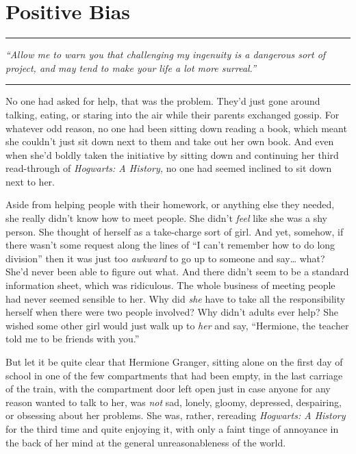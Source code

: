 \chapter{Positive Bias}

\begin{center}\rule{3in}{0.4pt}\end{center}

\emph{``Allow me to warn you that challenging my ingenuity is a
dangerous sort of project, and may tend to make your life a lot more
surreal.''}

\begin{center}\rule{3in}{0.4pt}\end{center}

No one had asked for help, that was the problem. They'd just gone around
talking, eating, or staring into the air while their parents exchanged
gossip. For whatever odd reason, no one had been sitting down reading a
book, which meant she couldn't just sit down next to them and take out
her own book. And even when she'd boldly taken the initiative by sitting
down and continuing her third read-through of \emph{Hogwarts: A
History,} no one had seemed inclined to sit down next to her.

Aside from helping people with their homework, or anything else they
needed, she really didn't know how to meet people. She didn't
\emph{feel} like she was a shy person. She thought of herself as a
take-charge sort of girl. And yet, somehow, if there wasn't some request
along the lines of ``I can't remember how to do long division'' then it
was just too \emph{awkward} to go up to someone and say\ldots{} what?
She'd never been able to figure out what. And there didn't seem to be a
standard information sheet, which was ridiculous. The whole business of
meeting people had never seemed sensible to her. Why did \emph{she} have
to take all the responsibility herself when there were two people
involved? Why didn't adults ever help? She wished some other girl would
just walk up to \emph{her} and say, ``Hermione, the teacher told me to
be friends with you.''

But let it be quite clear that Hermione Granger, sitting alone on the
first day of school in one of the few compartments that had been empty,
in the last carriage of the train, with the compartment door left open
just in case anyone for any reason wanted to talk to her, was \emph{not}
sad, lonely, gloomy, depressed, despairing, or obsessing about her
problems. She was, rather, rereading \emph{Hogwarts: A History} for the
third time and quite enjoying it, with only a faint tinge of annoyance
in the back of her mind at the general unreasonableness of the world.

